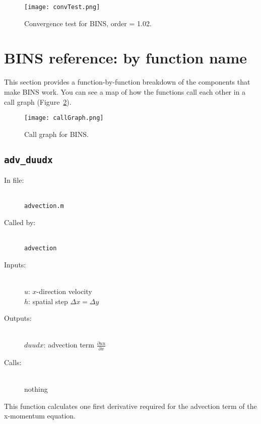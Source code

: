 \documentclass[12pt]{article}
\begin{document}
\begin{figure}
\center
\texttt{[image: convTest.png]} 
\caption{Convergence test for BINS, order = 1.02.}
\label{conv}
\end{figure}


\FloatBarrier
\section{BINS reference: by function name}
This section provides a function-by-function breakdown of the components that make BINS work.  You can see a map of how the functions call each other in a call graph (Figure~\ref{callGraph}).

\begin{figure}
\center
\texttt{[image: callGraph.png]} 
\caption{Call graph for BINS.}
\label{callGraph}
\end{figure}

\subsection{\texttt{adv\_duudx}}
\begin{description}
\item[In file:] \hfill \\ \texttt{advection.m}
\item[Called by:] \hfill \\ \texttt{advection}
\item[Inputs:] \hfill \\ $u$: $x$-direction velocity \\ $h$: spatial step $\Delta x = \Delta y$
\item[Outputs:] \hfill \\ $duudx$: advection term $\frac{\partial uu}{\partial x}$
\item[Calls:] \hfill \\ nothing
\end{description}
This function calculates one first derivative required for the advection term of the x-momentum equation.
\end{document}
